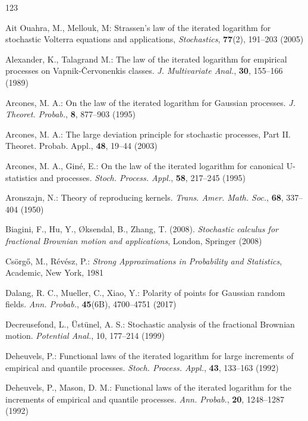\documentclass[11pt, reqno]{amsart}
\numberwithin{equation}{section}
\newcommand{\1}{{\bf 1}}
\newcommand{\2}{{\bf 2}}
\begin{document}
\begin{thebibliography}{123}


 {
  Ait Ouahra, M.,    Mellouk, M:  Strassen’s law of the iterated logarithm for stochastic Volterra equations and
applications, {\it Stochastics}, {\bf 77}(2), 191--203 (2005) }

 Alexander,   K.,   Talagrand M.: The law of the iterated logarithm for empirical processes on Vapnik-\v{C}ervonenkis classes. {\it J. Multivariate Anal.},  {\bf 30}, 155--166  (1989)

 
  
 Arcones,  M. A.:  On the law of the iterated logarithm for Gaussian processes. {\it J. Theoret.  Probab.},   {\bf 8},
877--903 (1995)



 Arcones,  M. A.:   The large deviation principle for stochastic processes, Part II.  Theoret. Probab. Appl., {\bf 48}, 19--44 (2003)
 

 Arcones, M. A.,     Gin\'e, E.: On the law of the iterated logarithm for canonical U-statistics and processes. {\it Stoch. Process.  Appl.},   {\bf 58},   217--245 (1995)
 
 

  Aronszajn, N.:   Theory of reproducing kernels. {\it Trans. Amer. Math. Soc.},   {\bf 68},   337--404 (1950)

Biagini, F., Hu, Y., {\O}ksendal, B.,   Zhang, T. (2008). {\it Stochastic calculus for fractional Brownian motion and applications}, London, Springer (2008)


  Cs\"{o}rg\H{o}, M.,    R\'ev\'esz, P.: {\it   Strong Approximations in Probability and Statistics}, Academic, New York, 1981 

 {Dalang,   R. C.,   Mueller,  C.,   Xiao, Y.:   Polarity of points for Gaussian random fields.  {\it Ann. Probab.},  {\bf 45}(6B), 4700--4751 (2017)}

Decreusefond, L., \"Ust\"unel, A. S.:   Stochastic analysis of the fractional Brownian motion. {\it Potential Anal.}, 10, 177--214 (1999)


 Deheuvels, P.: Functional laws of the iterated logarithm for large increments of empirical and quantile
processes. {\it Stoch. Process.  Appl.},  {\bf 43},   133--163 (1992)

  Deheuvels, P.,      Mason, D. M.: Functional laws of the iterated logarithm for the increments of empirical and quantile processes.
 {\it Ann. Probab.},  {\bf  20}, 1248--1287 (1992)
 

\end{thebibliography}
\end{document}

